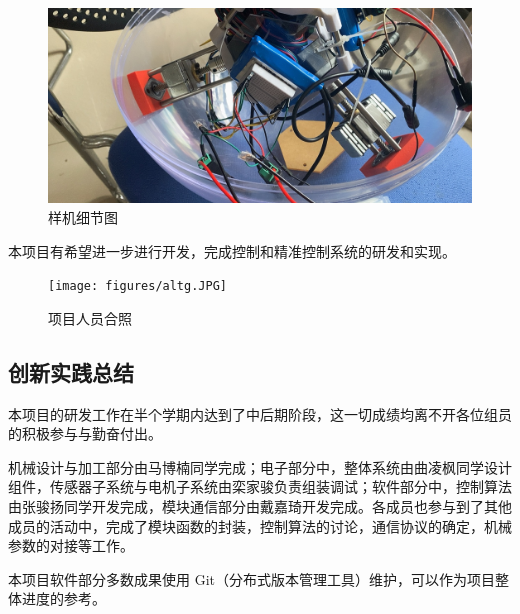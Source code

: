 \documentclass[a4paper]{ctexart}
\numberwithin{equation}{section}
\numberwithin{table}{section}
\numberwithin{figure}{section}
\begin{document}
\begin{figure}[H]
  \begin{center}
    \includegraphics[width=0.8\linewidth]{figures/result1.png}
  \end{center}
  \caption{样机细节图}
\end{figure}

本项目有希望进一步进行开发，完成控制和精准控制系统的研发和实现。

\begin{figure}[H]
  \begin{center}
    \texttt{[image: figures/altg.JPG]}
  \end{center}
  \caption{项目人员合照}
\end{figure}


\subsection{创新实践总结}

本项目的研发工作在半个学期内达到了中后期阶段，这一切成绩均离不开各位组员的积极参与与勤奋付出。

机械设计与加工部分由马博楠同学完成；电子部分中，整体系统由曲凌枫同学设计组件，传感器子系统与电机子系统由栾家骏负责组装调试；软件部分中，控制算法由张骏扬同学开发完成，模块通信部分由戴嘉琦开发完成。各成员也参与到了其他成员的活动中，完成了模块函数的封装，控制算法的讨论，通信协议的确定，机械参数的对接等工作。

本项目软件部分多数成果使用 Git（分布式版本管理工具）维护，可以作为项目整体进度的参考。
\end{document}
